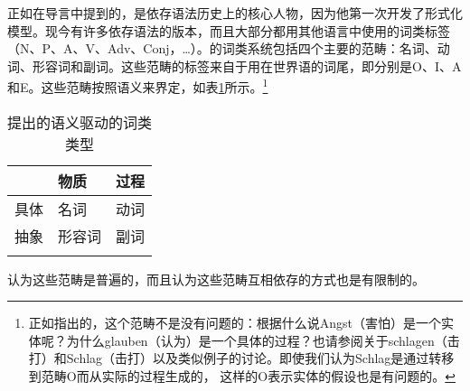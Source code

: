 正如在导言中提到的，\tes 是依存语法历史上的核心人物，因为他第一次开发了形式化模型\citep{Tesniere59a-u,Tesniere80a-u,Tesniere2015a-not-crossreferenced}。现今有许多依存语法的版本，而且大部分都用其他语言中使用的词类标签（N、P、A、V、Adv、Conj，\ldots）。\tes 的词类系统包括四个主要的范畴：名词、动词、形容词和副词。这些范畴的标签来自于用在世界语的词尾，即分别是O、I、A和E。这些范畴按照语义来界定，如表\ref{table-pos-tesniere}所示。\footnote{
正如\citet[]{Weber97a}指出的，这个范畴不是没有问题的：根据什么说Angst（害怕）是一个实体呢？为什么glauben（认为）是一个具体的过程？也请参阅\citet[\S~3.4]{Klein71a-u}关于schlagen（击打）和Schlag（击打）以及类似例子的讨论。即使我们认为Schlag是通过转移到范畴O而从实际的过程生成的， 这样的O表示实体的假设也是有问题的。
}
\begin{table}
\begin{tabular}{lll}
\lsptoprule
         & 物质 & 过程\\
\midrule
具体 & 名词 & 动词 \\
抽象 & 形容词 & 副词\\
\lspbottomrule
\end{tabular}
\caption{\label{table-pos-tesniere}\tes 提出的语义驱动的词类类型}
\end{table}%
\tes 认为这些范畴是普遍的，而且认为这些范畴互相依存的方式也是有限制的。

